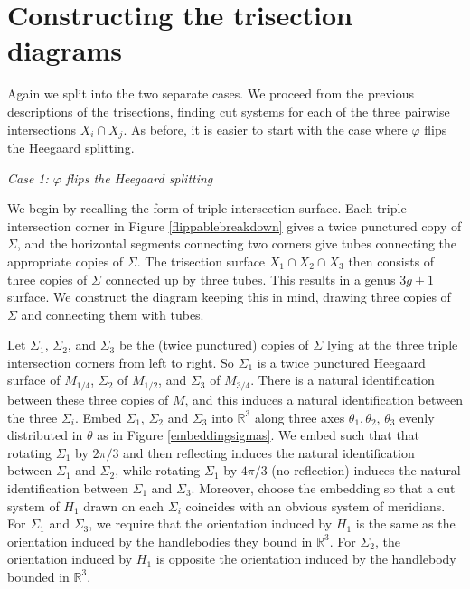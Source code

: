 \documentclass[12pt]{amsart}
\newcommand{\R}{\mathbb{R}}
\theoremstyle{definition}
\theoremstyle{remark}
\begin{document}
\section{Constructing the trisection diagrams}
\label{sec_diagrams}

Again we split into the two separate cases.
We proceed from the previous descriptions of the trisections, finding cut systems for each of the three pairwise intersections $X_i \cap X_j$.
As before, it is easier to start with the case where $\varphi$ flips the Heegaard splitting.

\smallskip
\noindent\textit{Case 1: $\varphi$ flips the Heegaard splitting}\ \

We begin by recalling the form of triple intersection surface.
Each triple intersection corner in Figure \ref{flippablebreakdown} gives a twice punctured copy of $\Sigma$, and the horizontal segments connecting two corners give tubes connecting the appropriate copies of $\Sigma$.
The trisection surface $X_1 \cap X_2 \cap X_3$ then consists of three copies of $\Sigma$ connected up by three tubes.
This results in a genus $3g+1$ surface.
We construct the diagram keeping this in mind, drawing three copies of $\Sigma$ and connecting them with tubes.


Let $\Sigma_1$, $\Sigma_2$, and $\Sigma_3$ be the (twice punctured) copies of $\Sigma$ lying at the three triple intersection corners from left to right.
So $\Sigma_1$ is a twice punctured Heegaard surface of $M_{1/4}$, $\Sigma_2$ of $M_{1/2}$, and $\Sigma_3$ of $M_{3/4}$.
 There is a natural identification between these three copies of $M$, and this induces a natural identification between the three $\Sigma_i$.
Embed $\Sigma_1$, $\Sigma_2$ and $\Sigma_3$ into $\R^3$ along three axes $\theta_1,\theta_2$, $\theta_3$ evenly distributed in $\theta$ as in Figure \ref{embeddingsigmas}.
We embed such that that rotating $\Sigma_1$ by $2\pi/3$ and then reflecting induces the natural identification between $\Sigma_1$ and $\Sigma_2$, while rotating $\Sigma_1$ by $4\pi/3$ (no reflection) induces the natural identification between $\Sigma_1$ and $\Sigma_3$.
Moreover, choose the embedding so that a cut system of $H_1$ drawn on each $\Sigma_i$ coincides with an obvious system of meridians.
For $\Sigma_1$ and $\Sigma_3$, we require that the orientation induced by $H_1$ is the same as the orientation induced by the handlebodies they bound in $\R^3$.
For $\Sigma_2$, the orientation induced by $H_1$ is opposite the orientation induced by the handlebody bounded in $\R^3$.
\end{document}
